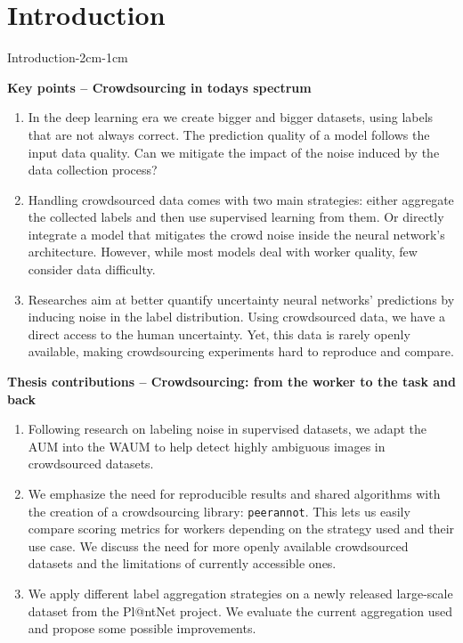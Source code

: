 \chapter{Introduction}
\enlargethispage{3\baselineskip}

\begin{keypointstwomargins}{Introduction}{-2cm}{-1cm}

        \textbf{Key points -- Crowdsourcing in todays spectrum}
        \begin{enumerate}[leftmargin=*]

        \item In the deep learning era we create bigger and bigger datasets, using labels that are not always correct. The prediction quality of a model follows the input data quality. Can we mitigate the impact of the noise induced by the data collection process?

        \item Handling crowdsourced data comes with two main strategies: either aggregate the collected labels and then use supervised learning from them. Or directly integrate a model that mitigates the crowd noise inside the neural network's architecture. However, while most models deal with worker quality, few consider data difficulty.

        \item Researches aim at better quantify uncertainty neural networks' predictions by inducing noise in the label distribution. Using crowdsourced data, we have a direct access to the human uncertainty. Yet, this data is rarely openly available, making crowdsourcing experiments hard to reproduce and compare.

        \end{enumerate}

        \textbf{Thesis contributions -- Crowdsourcing: from the worker to the task and back}
        \begin{enumerate}[leftmargin=*,start=4]
        \item Following research on labeling noise in supervised datasets, we adapt the AUM into the WAUM to help detect highly ambiguous images in crowdsourced datasets.

        \item We emphasize the need for reproducible results and shared algorithms with the creation of a crowdsourcing library: \texttt{peerannot}. This lets us easily compare scoring metrics for workers depending on the strategy used and their use case. We discuss the need for more openly available crowdsourced datasets and the limitations of currently accessible ones.

        \item We apply different label aggregation strategies on a newly released large-scale dataset from the Pl@ntNet project. We evaluate the current aggregation used and propose some possible improvements.
        \end{enumerate}

\end{keypointstwomargins}

